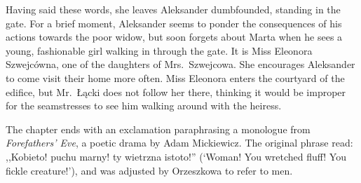 Having said these words, she leaves Aleksander dumbfounded, standing in the gate.
For a brief moment, Aleksander seems to ponder the consequences of his actions towards the poor widow, but soon forgets about Marta when he sees a young, fashionable girl walking in through the gate.
It is Miss Eleonora Szwejcówna, one of the daughters of Mrs.\ Szwejcowa.
She encourages Aleksander to come visit their home more often.
Miss Eleonora enters the courtyard of the edifice, but Mr.\ Łącki does not follow her there, thinking it would be improper for the seamstresses to see him walking around with the heiress.

The chapter ends with an exclamation paraphrasing a monologue from \textit{Forefathers' Eve}, a poetic drama by Adam Mickiewicz. The original phrase read: ,,Kobieto! puchu marny! ty wietrzna istoto!'' (`Woman! You wretched fluff! You fickle creature!'), and was adjusted by Orzeszkowa to refer to men.
